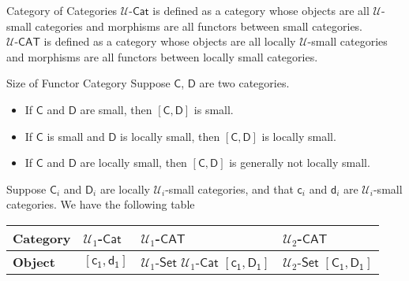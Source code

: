 \begin{definition}{Category of Categories}{}
    $\mathscr{U}$-$\mathsf{Cat}$ is defined as a category whose objects are all $\mathscr{U}$-small categories and morphisms are all functors between small categories.\\
    $\mathscr{U}$-$\mathsf{CAT}$ is defined as a category whose objects are all locally $\mathscr{U}$-small categories and morphisms are all functors between locally small categories. 
\end{definition}

\begin{proposition}{Size of Functor Category}{}
    Suppose $\mathsf{C}$, $\mathsf{D}$ are two categories. 
    \begin{itemize}
        \item If $\mathsf{C}$ and $\mathsf{D}$ are small, then $\left[\mathsf{C},\mathsf{D}\right]$ is small.
        \item If $\mathsf{C}$ is small and $\mathsf{D}$ is locally small, then $\left[\mathsf{C},\mathsf{D}\right]$ is locally small.
        \item If $\mathsf{C}$ and $\mathsf{D}$ are locally small, then $\left[\mathsf{C},\mathsf{D}\right]$ is generally not locally small.
    \end{itemize}
\end{proposition}


Suppose $\mathsf{C}_i$ and $\mathsf{D}_i$ are locally $\mathscr{U}_i$-small categories, and that $\mathsf{c}_i$ and $\mathsf{d}_i$ are $\mathscr{U}_i$-small categories. We have the following table
\begin{table}[h]
    \centering
    \begin{tabular}{P{2cm}|P{2cm}|P{2cm}|P{2cm}}
        \toprule
        \textbf{Category}&$\mathscr{U}_1$-$\mathsf{Cat}$ & $\mathscr{U}_1$-$\mathsf{CAT}$ & $\mathscr{U}_2$-$\mathsf{CAT}$ \\
        \midrule
        \midrule
        \textbf{Object}&$ [\mathsf{c_1},\mathsf{d_1}]$& $\mathscr{U}_1$-$\mathsf{Set}$ $\mathscr{U}_1$-$\mathsf{Cat}$ $[\mathsf{c_1},\mathsf{D_1}]$& $\mathscr{U}_2$-$\mathsf{Set}$ $[\mathsf{C_1},\mathsf{D_1}]$ \\ \bottomrule
    \end{tabular}
\end{table}

